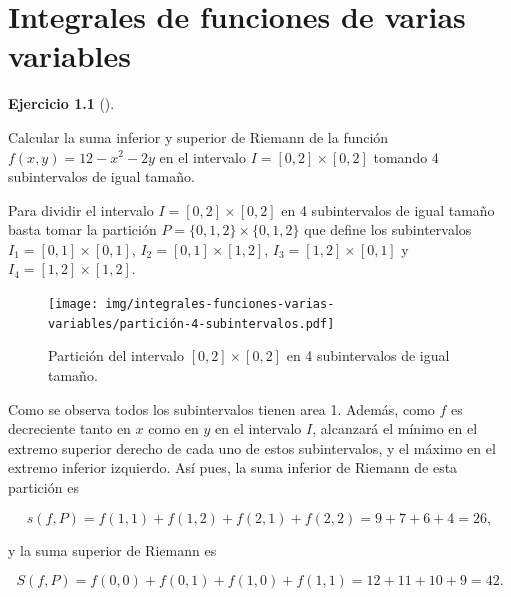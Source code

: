 \documentclass[
  a4paper,
]{scrreport}
\theoremstyle{definition}
\newtheorem{exercise}{Ejercicio}[chapter]
\theoremstyle{remark}
\begin{document}

\chapter{Integrales de funciones de varias
variables}\label{integrales-de-funciones-de-varias-variables}

\begin{exercise}[]\protect\hypertarget{exr-sumas-riemann-n-dimensional}{}\label{exr-sumas-riemann-n-dimensional}

Calcular la suma inferior y superior de Riemann de la función
\(f(x,y)=12-x^2-2y\) en el intervalo \(I=[0,2]\times[0,2]\) tomando
\(4\) subintervalos de igual tamaño.

\end{exercise}

\begin{tcolorbox}[enhanced jigsaw, coltitle=black, toptitle=1mm, colframe=quarto-callout-tip-color-frame, colbacktitle=quarto-callout-tip-color!10!white, breakable, opacityback=0, bottomtitle=1mm, opacitybacktitle=0.6, title=\textcolor{quarto-callout-tip-color}{\faLightbulb}\hspace{0.5em}{Solución}, arc=.35mm, leftrule=.75mm, toprule=.15mm, titlerule=0mm, bottomrule=.15mm, left=2mm, rightrule=.15mm, colback=white]

Para dividir el intervalo \(I=[0,2]\times[0,2]\) en 4 subintervalos de
igual tamaño basta tomar la partición \(P=\{0,1,2\}\times\{0,1,2\}\) que
define los subintervalos \(I_1=[0,1]\times [0,1]\),
\(I_2=[0,1]\times [1,2]\), \(I_3=[1,2]\times [0,1]\) y
\(I_4=[1,2]\times [1,2]\).

\begin{figure}[H]

{\centering \texttt{[image: img/integrales-funciones-varias-variables/partición-4-subintervalos.pdf]}

}

\caption{Partición del intervalo \([0,2]\times [0,2]\) en 4
subintervalos de igual tamaño.}

\end{figure}%

Como se observa todos los subintervalos tienen area 1. Además, como
\(f\) es decreciente tanto en \(x\) como en \(y\) en el intervalo \(I\),
alcanzará el mínimo en el extremo superior derecho de cada uno de estos
subintervalos, y el máximo en el extremo inferior izquierdo. Así pues,
la suma inferior de Riemann de esta partición es

\[
s(f,P) 
= f(1,1) + f(1,2) + f(2,1) + f(2,2)
= 9 + 7 + 6 + 4
= 26,
\]

y la suma superior de Riemann es

\[
S(f,P) 
= f(0,0) + f(0,1) + f(1,0) + f(1,1)
= 12 + 11 + 10 + 9 
= 42.
\]

\end{tcolorbox}
\end{document}
